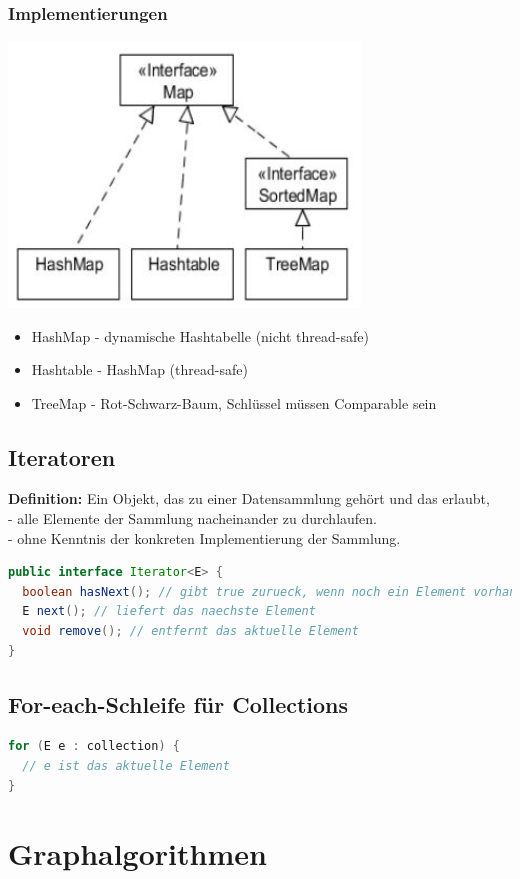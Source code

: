 \documentclass{scrreprt}
\begin{document}
\subsection{Implementierungen}
\includegraphics[width=0.7\textwidth]{graphics/Maps}
\begin{itemize}
  \item HashMap - dynamische Hashtabelle (nicht thread-safe)
  \item Hashtable - HashMap (thread-safe)
  \item TreeMap - Rot-Schwarz-Baum, Schlüssel müssen Comparable sein
\end{itemize}
\section{Iteratoren}
\textbf{Definition:} Ein Objekt, das zu einer Datensammlung gehört und das erlaubt, 
\\- alle Elemente der Sammlung nacheinander zu durchlaufen.
\\- ohne Kenntnis der konkreten Implementierung der Sammlung.
\begin{lstlisting}[language=Java]
public interface Iterator<E> {
  boolean hasNext(); // gibt true zurueck, wenn noch ein Element vorhanden ist
  E next(); // liefert das naechste Element
  void remove(); // entfernt das aktuelle Element
}
\end{lstlisting}
\section{For-each-Schleife für Collections}
\begin{lstlisting}[language=Java]
for (E e : collection) {
  // e ist das aktuelle Element
}
\end{lstlisting}

\chapter{Graphalgorithmen}
\end{document}
